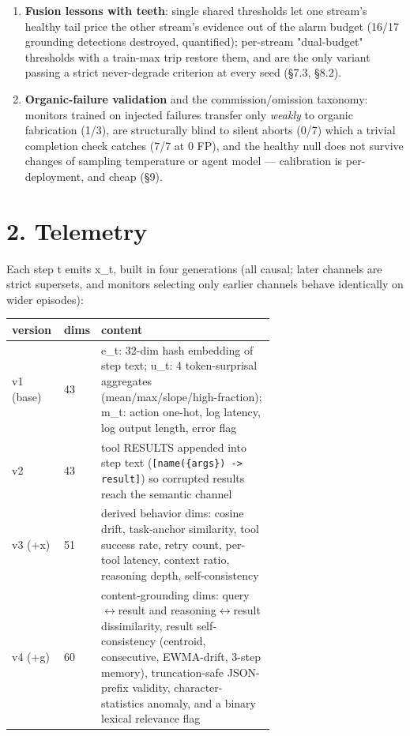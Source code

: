 \documentclass[11pt]{article}
\begin{document}
\begin{enumerate}
\item \textbf{Fusion lessons with teeth}: single shared thresholds let one stream's healthy tail price the other stream's evidence out of the alarm budget (16/17 grounding detections destroyed, quantified); per-stream "dual-budget" thresholds with a train-max trip restore them, and are the only variant passing a strict never-degrade criterion at every seed (\S{}7.3, \S{}8.2).
\item \textbf{Organic-failure validation} and the commission/omission taxonomy: monitors trained on injected failures transfer only \emph{weakly} to organic fabrication (1/3), are structurally blind to silent aborts (0/7) which a trivial completion check catches (7/7 at 0 FP), and the healthy null does not survive changes of sampling temperature or agent model --- calibration is per-deployment, and cheap (\S{}9).
\end{enumerate}

\section{2. Telemetry}


Each step t emits x\_t, built in four generations (all causal; later channels are strict supersets, and monitors selecting only earlier channels behave identically on wider episodes):


\begin{longtable}{ll>{\raggedright\arraybackslash}p{0.660\linewidth}}
\toprule
\textbf{version} & \textbf{dims} & \textbf{content} \\
\midrule
\endhead
v1 (base) & 43 & e\_t: 32-dim hash embedding of step text; u\_t: 4 token-surprisal aggregates (mean/max/slope/high-fraction); m\_t: action one-hot, log latency, log output length, error flag \\
v2 & 43 & tool RESULTS appended into step text (\texttt{[name(\{args\}) -> result]}) so corrupted results reach the semantic channel \\
v3 (+x) & 51 & 8 derived behavior dims: cosine drift, task-anchor similarity, tool success rate, retry count, per-tool latency, context ratio, reasoning depth, self-consistency \\
v4 (+g) & 60 & 9 content-grounding dims: query$\leftrightarrow$result and reasoning$\leftrightarrow$result dissimilarity, result self-consistency (centroid, consecutive, EWMA-drift, 3-step memory), truncation-safe JSON-prefix validity, character-statistics anomaly, and a binary lexical relevance flag \\
\bottomrule
\end{longtable}
\end{document}
